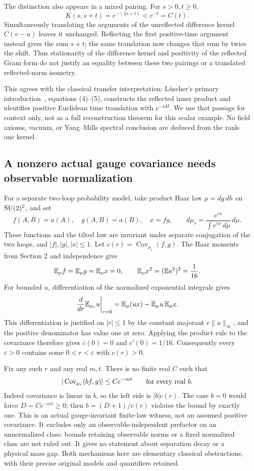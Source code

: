 \documentclass[11pt]{article}
\begin{document}
The distinction also appears in a mixed pairing. For $s>0,t\geq0$,
\[
 K(s,s+t)=e^{-(2s+t)}<e^{-t}=C(t).
\]
Simultaneously translating the arguments of the unreflected
difference kernel $C(v-u)$ leaves it unchanged. Reflecting the
first positive-time argument instead gives the sum $s+t$; the
same translation now changes that sum by twice the shift.
Thus stationarity of the difference kernel and positivity of the
reflected Gram form do not justify an equality between these two
pairings or a translated reflected-norm isometry.

This agrees with the classical transfer interpretation: L\"uscher's
primary introduction~\cite{Luscher}, equations (4)--(5), constructs
the reflected inner product and identifies positive Euclidean time
translation with $e^{-aH}$. We use that passage for context only,
not as a full reconstruction theorem for this scalar example.
No field axioms, vacuum, or Yang--Mills spectral conclusion are
deduced from the rank-one kernel.

\subsection*{A nonzero actual gauge covariance needs observable normalization}
For a separate two-loop probability model, take product Haar law
$\mu=dg\,dh$ on $\mathrm{SU}(2)^2$, and set
\[
 f(A,B)=a(A),\quad g(A,B)=a(B),\quad x=fg,\qquad
 d\mu_r=\frac{e^{rx}}{\int e^{rx}\,d\mu}\,d\mu.
\]
These functions and the tilted law are invariant under separate
conjugation of the two loops, and $|f|,|g|,|x|\leq1$.
Let $c(r)=\operatorname{Cov}_{\mu_r}(f,g)$.
The Haar moments from Section 2 and independence give
\[
 \mathbb E_\mu f=\mathbb E_\mu g=\mathbb E_\mu x=0,\qquad
 \mathbb E_\mu x^2=(\mathbb E a^2)^2=\frac1{16}.
\]
For bounded $u$, differentiation of the normalized exponential
integrals gives
\[
 \left.\frac d{dr}\mathbb E_{\mu_r}u\right|_{r=0}
   =\mathbb E_\mu(ux)-\mathbb E_\mu u\,\mathbb E_\mu x.
\]
This differentiation is justified on $|r|\leq1$ by the constant
majorant $e\|u\|_\infty$, and the positive denominator has value
one at zero. Applying the product rule to the covariance therefore
gives $c(0)=0$ and $c'(0)=1/16$.
Consequently every $\varepsilon>0$ contains some
$0<r<\varepsilon$ with $c(r)>0$.

Fix any such $r$ and any real $m,t$. There is no finite real $C$
such that
\begin{equation}\label{eq:scaled-cluster-impossible}
 |\operatorname{Cov}_{\mu_r}(b f,g)|\leq C e^{-mt}
                       \qquad\hbox{for every real }b.
\end{equation}
Indeed covariance is linear in $b$, so the left side is
$|b|c(r)$. The case $b=0$ would force $D=Ce^{-mt}\geq0$;
then $b=(D+1)/c(r)$ violates the bound by exactly one.
This is an actual gauge-invariant finite-law witness, not an
assumed positive covariance. It excludes only an observable-independent
prefactor on an unnormalized class: bounds retaining observable
norms or a fixed normalized class are not ruled out.
It gives no statement about separation decay or a physical mass gap.
Both mechanisms here are elementary classical obstructions, with
their precise original models and quantifiers retained.
\end{document}
